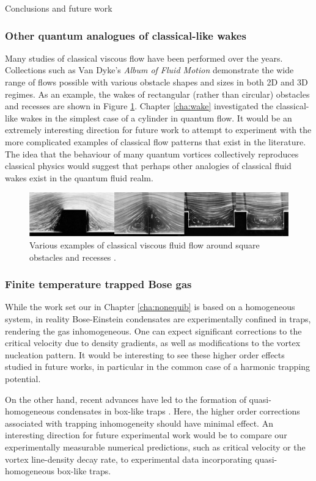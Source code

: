 \begin{chapter}{\label{cha:conc}Conclusions and future work}
\subsubsection{Other quantum analogues of classical-like wakes}
Many studies of classical viscous flow have been performed over the years. Collections such as Van Dyke's {\it Album of Fluid Motion} \cite{nagib} demonstrate the wide range of flows possible with various obstacle shapes and sizes in both 2D and 3D regimes. As an example, the wakes of rectangular (rather than circular) obstacles and recesses are shown in Figure \ref{fig:dyke-imgs}. Chapter \ref{cha:wake} investigated the classical-like wakes in the simplest case of a cylinder in quantum flow. It would be an extremely interesting direction for future work to attempt to experiment with the more complicated examples of classical flow patterns that exist in the literature. The idea that the behaviour of many quantum vortices collectively reproduces classical physics would suggest that perhaps other analogies of classical fluid wakes exist in the quantum fluid realm. 
\begin{figure}
\centering
    \includegraphics[width=\linewidth]{wake/square.png}
  \caption{Various examples of classical viscous fluid flow around square obstacles and recesses \cite{nagib}.} 
  \label{fig:dyke-imgs}
\end{figure}

\subsubsection{Finite temperature trapped Bose gas}
While the work set our in Chapter \ref{cha:nonequib} is based on a homogeneous system, in reality Bose-Einstein condensates are experimentally confined in traps, rendering the gas inhomogeneous. One can expect significant corrections to the critical velocity due to density gradients, as well as modifications to the vortex nucleation pattern. It would be interesting to see these higher order effects studied in future works, in particular in the common case of a harmonic trapping potential.

On the other hand, recent advances have led to the formation of quasi-homogeneous condensates in box-like traps \cite{gaunt_2013,chomaz_2015}. Here, the higher order corrections associated with trapping inhomogeneity should have minimal effect. An interesting direction for future experimental work would be to compare our experimentally measurable numerical predictions, such as critical velocity or the vortex line-density decay rate, to experimental data incorporating quasi-homogeneous box-like traps.


\end{chapter}
